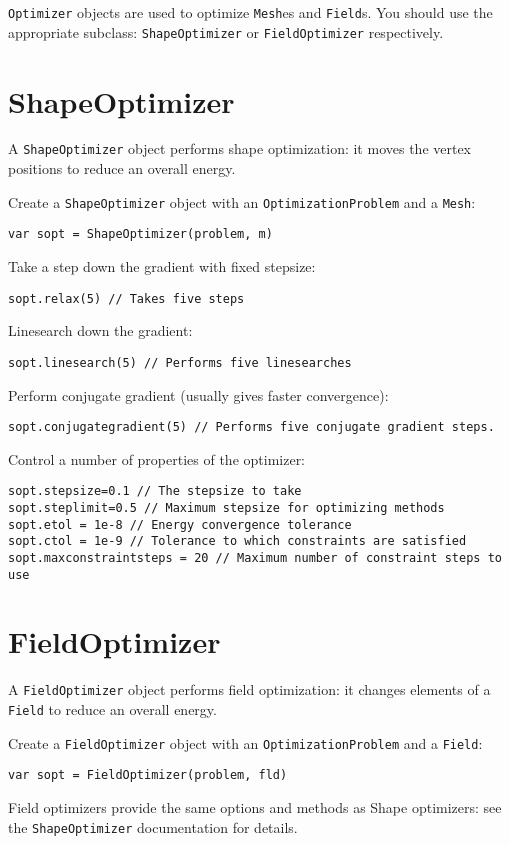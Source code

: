 \texttt{Optimizer} objects are used to optimize \texttt{Mesh}es and
\texttt{Field}s. You should use the appropriate subclass:
\texttt{ShapeOptimizer} or \texttt{FieldOptimizer} respectively.

\hypertarget{shapeoptimizer}{%
\section{ShapeOptimizer}\label{shapeoptimizer}}

A \texttt{ShapeOptimizer} object performs shape optimization: it moves
the vertex positions to reduce an overall energy.

Create a \texttt{ShapeOptimizer} object with an
\texttt{OptimizationProblem} and a \texttt{Mesh}:

\begin{lstlisting}
var sopt = ShapeOptimizer(problem, m)
\end{lstlisting}

Take a step down the gradient with fixed stepsize:

\begin{lstlisting}
sopt.relax(5) // Takes five steps
\end{lstlisting}

Linesearch down the gradient:

\begin{lstlisting}
sopt.linesearch(5) // Performs five linesearches
\end{lstlisting}

Perform conjugate gradient (usually gives faster convergence):

\begin{lstlisting}
sopt.conjugategradient(5) // Performs five conjugate gradient steps.
\end{lstlisting}

Control a number of properties of the optimizer:

\begin{lstlisting}
sopt.stepsize=0.1 // The stepsize to take
sopt.steplimit=0.5 // Maximum stepsize for optimizing methods
sopt.etol = 1e-8 // Energy convergence tolerance
sopt.ctol = 1e-9 // Tolerance to which constraints are satisfied
sopt.maxconstraintsteps = 20 // Maximum number of constraint steps to use
\end{lstlisting}

\hypertarget{fieldoptimizer}{%
\section{FieldOptimizer}\label{fieldoptimizer}}

A \texttt{FieldOptimizer} object performs field optimization: it changes
elements of a \texttt{Field} to reduce an overall energy.

Create a \texttt{FieldOptimizer} object with an
\texttt{OptimizationProblem} and a \texttt{Field}:

\begin{lstlisting}
var sopt = FieldOptimizer(problem, fld)
\end{lstlisting}

Field optimizers provide the same options and methods as Shape
optimizers: see the \texttt{ShapeOptimizer} documentation for details.
